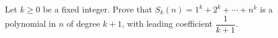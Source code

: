 Let $k\ge0$ be a fixed integer. Prove that $S_k(n)=1^k+2^k+\cdots+n^k$ is a polynomial in $n$ of degree $k+1$, with leading coefficient $\dfrac{1}{k+1}$.
